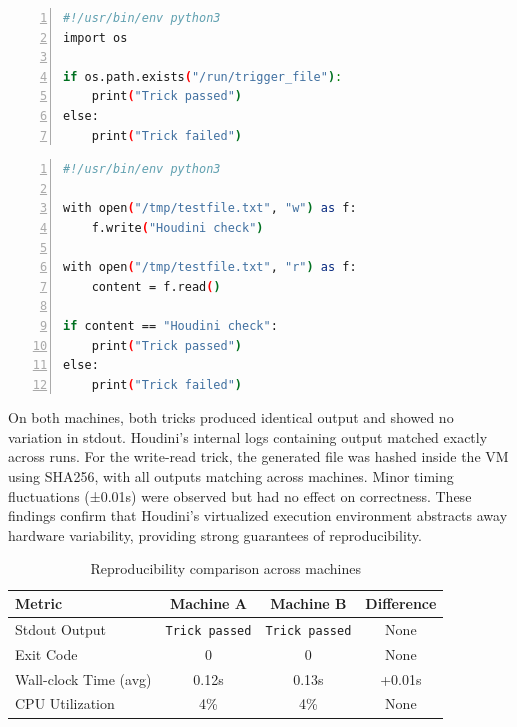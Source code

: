 \begin{doublespace}
\begin{lstlisting}[language=bash, caption={Trick \#1}, label={lst:escape-trick}, numbers=left, numberstyle=\tiny, stepnumber=1, frame=single, breaklines=true, backgroundcolor=\color{gray!10}, basicstyle=\ttfamily\footnotesize, showspaces=false, showstringspaces=false]
#!/usr/bin/env python3
import os

if os.path.exists("/run/trigger_file"):
    print("Trick passed")
else:
    print("Trick failed")
\end{lstlisting}

\begin{lstlisting}[language=bash, caption={Trick \#2}, label={lst:escape-trick}, numbers=left, numberstyle=\tiny, stepnumber=1, frame=single, breaklines=true, backgroundcolor=\color{gray!10}, basicstyle=\ttfamily\footnotesize, showspaces=false, showstringspaces=false]
#!/usr/bin/env python3

with open("/tmp/testfile.txt", "w") as f:
    f.write("Houdini check")

with open("/tmp/testfile.txt", "r") as f:
    content = f.read()

if content == "Houdini check":
    print("Trick passed")
else:
    print("Trick failed")
\end{lstlisting}

On both machines, both tricks produced identical output and showed no variation in stdout. Houdini’s internal logs containing output matched exactly across runs. For the write-read trick, the generated file was hashed inside the VM using SHA256, with all outputs matching across machines. Minor timing fluctuations (±0.01s) were observed but had no effect on correctness. These findings confirm that Houdini's virtualized execution environment abstracts away hardware variability, providing strong guarantees of reproducibility.

\begin{table}[h]
\centering
\caption{Reproducibility comparison across machines}
\label{tab:reproducibility-results}
\begin{tabular}{|l|c|c|c|}
\hline
\textbf{Metric} & \textbf{Machine A} & \textbf{Machine B} & \textbf{Difference} \\
\hline
Stdout Output & \texttt{Trick passed} & \texttt{Trick passed} & None \\
Exit Code & 0 & 0 & None \\
Wall-clock Time (avg) & 0.12s & 0.13s & +0.01s \\
CPU Utilization & 4\% & 4\% & None \\
\hline
\end{tabular}
\end{table}


\end{doublespace}
